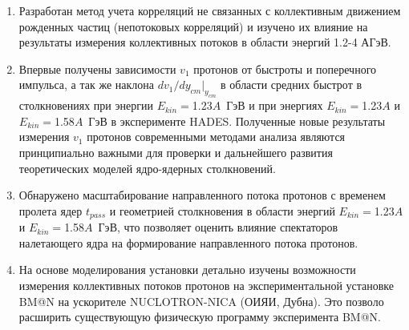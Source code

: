 \begin{enumerate}
  \item Разработан метод учета корреляций не связанных с коллективным
движением рожденных частиц (непотоковых корреляций) и изучено
их влияние на результаты измерения коллективных потоков в области энергий 1.2-4 АГэВ. 
  \item Впервые получены зависимости  $v_1$ протонов от быстроты и поперечного импульса, а так же наклона $dv_1/dy_{cm}|_{y_{cm}}$ в 
  области средних быстрот в столкновениях \au{} при  энергии  $E_{kin}=$1.23$A$~ГэВ и \ag{} 
  при энергиях $E_{kin}=$1.23$A$ и $E_{kin}=$1.58$A$~ГэВ в эксперименте HADES. Полу­ченные новые результаты измерения $v_1$ протонов современными методами 
  анализа являются принципиально важными для проверки и
дальнейшего развития теоретических моделей ядро-ядерных столкновений.
  \item Обнаружено масштабирование направленного потока протонов с временем пролета ядер $t_{pass}$ и геометрией столкновения в области
   энергий $E_{kin}=$1.23$A$ и $E_{kin}=$1.58$A$~ГэВ, что позволяет оценить влияние спектаторов налетающего ядра на
формирование направленного потока протонов.
  \item На основе моделирования установки детально изучены возможности измерения коллективных потоков протонов на экспериментальной установке BM@N на ускорителе
NUCLOTRON-NICA (ОИЯИ, Дубна). Это позволо расширить существующую физическую программу эксперимента BM@N.
\end{enumerate}
